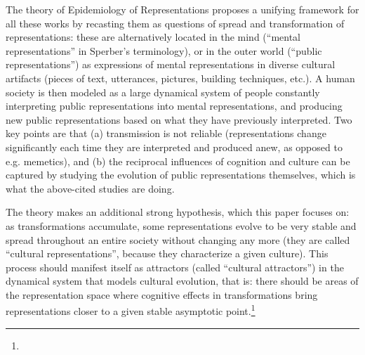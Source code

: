 \begin{new}
The theory of Epidemiology of Representations proposes a unifying framework for all these works by recasting them as questions of spread and transformation of representations:
these are alternatively located in the mind (``mental representations'' in Sperber's terminology), or in the outer world (``public representations'') as expressions of mental representations in diverse cultural artifacts (pieces of text, utterances, pictures, building techniques, etc.).
A human society is then modeled as a large dynamical system of people constantly interpreting public representations into mental representations, and producing new public representations based on what they have previously interpreted.
Two key points are that (a) transmission is not reliable (representations change significantly each time they are interpreted and produced anew, as opposed to \hbox{e.g.} memetics), and (b) the reciprocal influences of cognition and culture can be captured by studying the evolution of public representations themselves, which is what the above-cited studies are doing.

The theory makes an additional strong hypothesis, which this paper focuses on:
as transformations accumulate, some representations evolve to be very stable and spread throughout an entire society without changing any more (they are called ``cultural representations'', because they characterize a given culture).
This process should manifest itself as attractors (called ``cultural attractors'') in the dynamical system that models cultural evolution, that is:
there should be areas of the representation space where cognitive effects in transformations bring representations closer to a given stable asymptotic point.\footnote{
}


\end{new}
